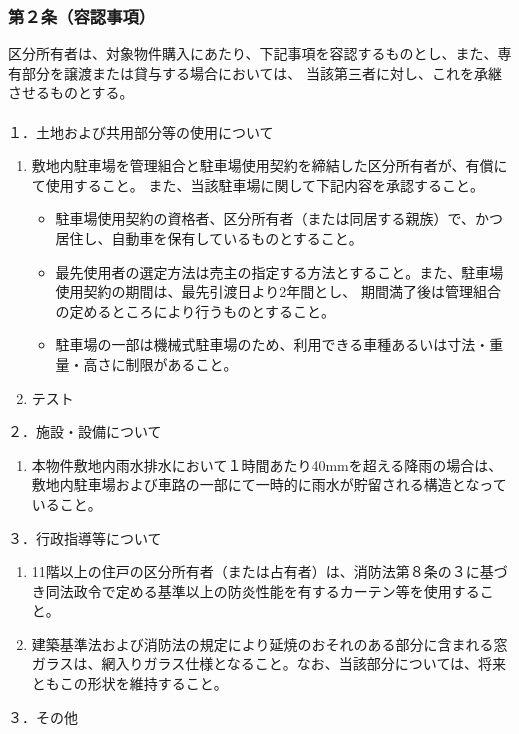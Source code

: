 \documentclass[12pt,uplatex]{jsarticle}
\begin{document}
\subsubsection*{第２条（容認事項）}
区分所有者は、対象物件購入にあたり、下記事項を容認するものとし、また、専有部分を譲渡または貸与する場合においては、
当該第三者に対し、これを承継させるものとする。\\
\\
１．土地および共用部分等の使用について
\begin{enumerate}
  \item 敷地内駐車場を管理組合と駐車場使用契約を締結した区分所有者が、有償にて使用すること。
  また、当該駐車場に関して下記内容を承認すること。
  \begin{itemize}
    \item 駐車場使用契約の資格者、区分所有者（または同居する親族）で、かつ居住し、自動車を保有しているものとすること。
    \item 最先使用者の選定方法は売主の指定する方法とすること。また、駐車場使用契約の期間は、最先引渡日より2年間とし、
    期間満了後は管理組合の定めるところにより行うものとすること。
    \item 駐車場の一部は機械式駐車場のため、利用できる車種あるいは寸法・重量・高さに制限があること。
  \end{itemize}
  \item テスト
\end{enumerate}
２．施設・設備について
\begin{enumerate}
\item 本物件敷地内雨水排水において１時間あたり40mmを超える降雨の場合は、敷地内駐車場および車路の一部にて一時的に雨水が貯留される構造となっていること。
\end{enumerate}
３．行政指導等について
\begin{enumerate}
\item 11階以上の住戸の区分所有者（または占有者）は、消防法第８条の３に基づき同法政令で定める基準以上の防炎性能を有するカーテン等を使用すること。
\item 建築基準法および消防法の規定により延焼のおそれのある部分に含まれる窓ガラスは、網入りガラス仕様となること。なお、当該部分については、将来ともこの形状を維持すること。
\end{enumerate}
３．その他
\end{document}
